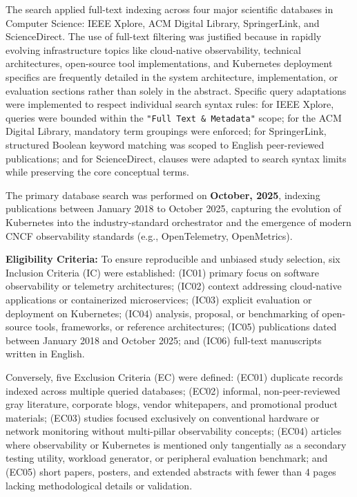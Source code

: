\documentclass[sigconf, anonymous, balance=false]{acmart}
\begin{document}
The search applied full-text indexing across four major scientific databases in Computer Science: IEEE Xplore, ACM Digital Library, SpringerLink, and ScienceDirect. The use of full-text filtering was justified because in rapidly evolving infrastructure topics like cloud-native observability, technical architectures, open-source tool implementations, and Kubernetes deployment specifics are frequently detailed in the system architecture, implementation, or evaluation sections rather than solely in the abstract. Specific query adaptations were implemented to respect individual search syntax rules: for IEEE Xplore, queries were bounded within the \texttt{"Full Text \& Metadata"} scope; for the ACM Digital Library, mandatory term groupings were enforced; for SpringerLink, structured Boolean keyword matching was scoped to English peer-reviewed publications; and for ScienceDirect, clauses were adapted to search syntax limits while preserving the core conceptual terms.

The primary database search was performed on \textbf{October, 2025}, indexing publications between January 2018 to October 2025, capturing the evolution of Kubernetes into the industry-standard orchestrator and the emergence of modern CNCF observability standards (e.g., OpenTelemetry, OpenMetrics).

\textbf{Eligibility Criteria:} To ensure reproducible and unbiased study selection, six Inclusion Criteria (IC) were established: (IC01) primary focus on software observability or telemetry architectures; (IC02) context addressing cloud-native applications or containerized microservices; (IC03) explicit evaluation or deployment on Kubernetes; (IC04) analysis, proposal, or benchmarking of open-source tools, frameworks, or reference architectures; (IC05) publications dated between January 2018 and October 2025; and (IC06) full-text manuscripts written in English.

Conversely, five Exclusion Criteria (EC) were defined: (EC01) duplicate records indexed across multiple queried databases; (EC02) informal, non-peer-reviewed gray literature, corporate blogs, vendor whitepapers, and promotional product materials; (EC03) studies focused exclusively on conventional hardware or network monitoring without multi-pillar observability concepts; (EC04) articles where observability or Kubernetes is mentioned only tangentially as a secondary testing utility, workload generator, or peripheral evaluation benchmark; and (EC05) short papers, posters, and extended abstracts with fewer than 4 pages lacking methodological details or validation.
\end{document}

